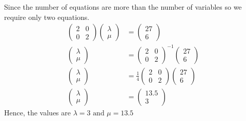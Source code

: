 \documentclass[12pt]{article}
\newcommand{\myvec}[1]{\ensuremath{\begin{pmatrix}#1\end{pmatrix}}}
\begin{document}
Since the number of equations are more than the number of variables so we require only two equations.
\begin{align}
	\myvec{2&0\\0&2}\myvec{\lambda\\\mu}&=\myvec{27\\6}\\
	\myvec{\lambda\\\mu}&=\myvec{2&0\\0&2}^{-1}\myvec{27\\6}\\
	\myvec{\lambda\\\mu}&= \frac{1}{4} \myvec{2&0\\0&2} \myvec{27\\6}\\
	\myvec{\lambda\\\mu}&=\myvec{13.5\\3}
\end{align}
Hence, the values are $\lambda = 3 \text{ and } \mu = 13.5$
\end{document}
